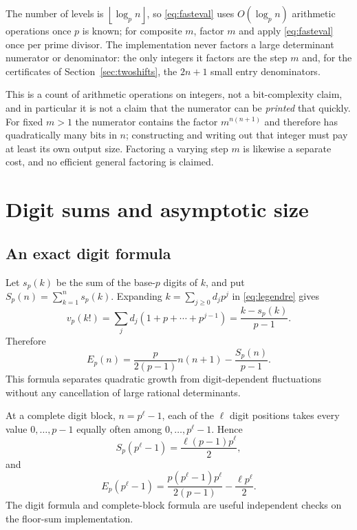 \documentclass[11pt,a4paper]{article}
\numberwithin{equation}{section}
\theoremstyle{definition}
\theoremstyle{remark}
\newcommand{\floor}[1]{\left\lfloor#1\right\rfloor}
\begin{document}
The number of levels is $\floor{\log_pn}$, so \eqref{eq:fasteval} uses $O(\log_pn)$ arithmetic operations once $p$ is known; for composite $m$, factor $m$ and apply \eqref{eq:fasteval} once per prime divisor. The implementation never factors a large determinant numerator or denominator: the only integers it factors are the step $m$ and, for the certificates of Section~\ref{sec:twoshifts}, the $2n+1$ small entry denominators.

This is a count of arithmetic operations on integers, not a bit-complexity claim, and in particular it is not a claim that the numerator can be \emph{printed} that quickly. For fixed $m>1$ the numerator contains the factor $m^{n(n+1)}$ and therefore has quadratically many bits in $n$; constructing and writing out that integer must pay at least its own output size. Factoring a varying step $m$ is likewise a separate cost, and no efficient general factoring is claimed.

\section{Digit sums and asymptotic size}\label{sec:asymptotics}

\subsection{An exact digit formula}
Let $s_p(k)$ be the sum of the base-$p$ digits of $k$, and put
$S_p(n)=\sum_{k=1}^n s_p(k)$. Expanding $k=\sum_{j\geq0}d_jp^j$ in \eqref{eq:legendre} gives
\[
 v_p(k!)=\sum_jd_j(1+p+\cdots+p^{j-1})
 =\frac{k-s_p(k)}{p-1}.
\]
Therefore
\begin{equation}\label{eq:digitE}
 E_p(n)=\frac{p}{2(p-1)}n(n+1)-\frac{S_p(n)}{p-1}.
\end{equation}
This formula separates quadratic growth from digit-dependent fluctuations without any cancellation of large rational determinants.

At a complete digit block, $n=p^\ell-1$, each of the $\ell$ digit positions takes every value $0,\ldots,p-1$ equally often among $0,\ldots,p^\ell-1$. Hence
\[
 S_p(p^\ell-1)=\frac{\ell(p-1)p^\ell}{2},
\]
and
\begin{equation}\label{eq:completeblock}
 E_p(p^\ell-1)=
 \frac{p(p^\ell-1)p^\ell}{2(p-1)}-\frac{\ell p^\ell}{2}.
\end{equation}
The digit formula and complete-block formula are useful independent checks on the floor-sum implementation.
\end{document}

